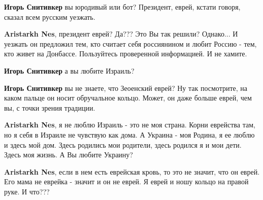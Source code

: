 \begin{itemize}
\begin{itemize}
\textbf{Игорь Снитивкер} вы юродивый или бот? Президент, еврей, кстати говоря, сказал всем русским уезжать.

 
\textbf{Aristarkh Nes}, президент еврей? Да??? Это Вы так решили? Однако... И уезжать он предложил тем, кто считает себя россиянином и любит Россию - тем, кто живет на Донбассе. Пользуйтесь проверенной информацией. И не хамите.

 
\textbf{Игорь Снитивкер} а вы любите Израиль?

 
\textbf{Игорь Снитивкер} вы не знаете, что Зеоенский еврей? Ну так посмотрите, на каком пальце он носит обручальное кольцо. Может, он даже больше еврей, чем вы, с точки зрения традиции.

 
\textbf{Aristarkh Nes}, я не люблю Израиль - это не моя страна. Корни еврейства там, но я себя в Израиле не чувствую как дома. А Украина - моя Родина, я ее люблю и здесь мой дом. Здесь родились мои родители, здесь родился я и мои дети. Здесь моя жизнь. А Вы любите Украину?

 
\textbf{Aristarkh Nes}, если в нем есть еврейская кровь, то это не значит, что он еврей. Его мама не еврейка - значит и он не еврей. Я еврей и ношу кольцо на правой руке. И что???


\end{itemize}
\end{itemize}
